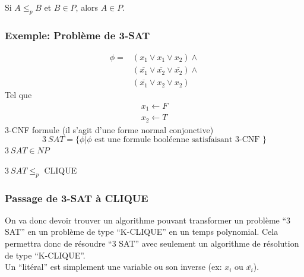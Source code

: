 \documentclass[a4paper,12pt]{article}
\begin{document}
    \begin{importantBox}
      Si $A \leq_p B$ et $B \in P$, alors $A \in P$.
    \end{importantBox}

    \subsubsection{Exemple: Problème de 3-SAT}
      \begin{align*}
	\phi = &(x_1 \vee x_1 \vee x_2) \wedge \\
	&(\overline{x_1} \vee \overline{x_2} \vee \overline{x_2}) \wedge \\
	&(\overline{x_1} \vee x_2 \vee x_2)
      \end{align*}
      Tel que
      \begin{align*}
	x_1 \leftarrow F\\
	x_2 \leftarrow T
      \end{align*}
      3-CNF formule (il s'agit d'une forme normal conjonctive)
      $$3\ SAT = \big\{\phi | \phi \text{ est une formule booléenne satisfaisant 3-CNF } \big\}$$
      $3\ SAT \in NP$

      \begin{theoremeBox}
	$3\ SAT \leq_p$ CLIQUE
      \end{theoremeBox}

    \subsubsection{Passage de 3-SAT à CLIQUE}
      On va donc devoir trouver un algorithme pouvant transformer un problème ``3 SAT'' en un problème de type ``K-CLIQUE'' en un temps polynomial.  Cela permettra donc de résoudre ``3 SAT'' avec seulement un algorithme de résolution de type ``K-CLIQUE''.\\
      Un ``litéral'' est simplement une variable ou son inverse (ex: $x_i$ ou $\overline{x_i}$).
\end{document}
